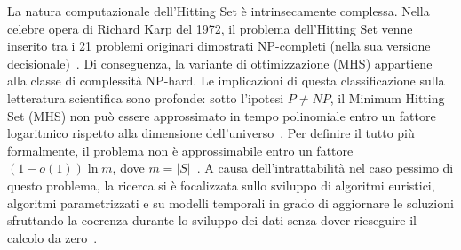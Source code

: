 La natura computazionale dell'Hitting Set è intrinsecamente complessa. Nella celebre opera di Richard Karp del 1972, il problema dell'Hitting Set venne inserito tra i 21 problemi originari dimostrati NP-completi (nella sua versione decisionale)~\cite{karp1972}. Di conseguenza, la variante di ottimizzazione (MHS) appartiene alla classe di complessità NP-hard.
Le implicazioni di questa classificazione sulla letteratura scientifica sono profonde: sotto l'ipotesi $P \neq NP$, il Minimum Hitting Set (MHS) non può essere approssimato in tempo polinomiale entro un fattore logaritmico rispetto alla dimensione dell'universo~\cite{johnson1974, feige1998}.
Per definire il tutto più formalmente, il problema non è approssimabile entro un fattore $(1-o(1))\ln m$, dove $m = |S|$~\cite{feige1998}.
A causa dell'intrattabilità nel caso pessimo di questo problema, la ricerca si è focalizzata sullo sviluppo di algoritmi euristici, algoritmi parametrizzati e su modelli temporali in grado di aggiornare le soluzioni sfruttando la coerenza durante lo sviluppo dei dati senza dover rieseguire il calcolo da zero~\cite{downey2013}.